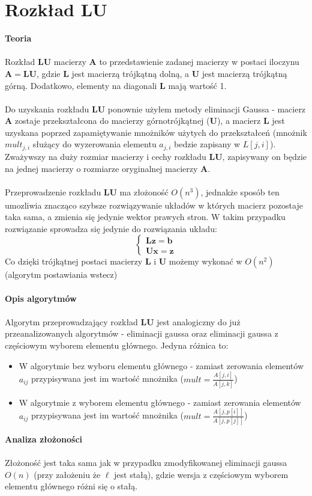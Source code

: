 \documentclass{article}
\newcommand{\mA}{\bm{A}}
\newcommand{\mL}{\bm{L}}
\newcommand{\mU}{\bm{U}}
\newcommand{\vb}{\bm{b}}
\newcommand{\vx}{\bm{x}}
\begin{document}
\section*{Rozkład LU}
\noindent \textbf{Teoria}\\\\
\indent Rozkład $\mL\mU$ macierzy $\mA$ to przedstawienie zadanej macierzy w postaci iloczynu $\mA=\mL\mU$, gdzie $\mL$ jest macierzą trójkątną dolną, a $\mU$ jest macierzą trójkątną górną. Dodatkowo, elementy na diagonali $\mL$ mają wartość 1. \\\\
\indent Do uzyskania rozkładu $\mL\mU$ ponownie użyłem metody eliminacji Gaussa - macierz $\mA$ zostaje przekształcona do macierzy górnotrójkątnej ($\mU$), a macierz $\mL$ jest uzyskana poprzed zapamiętywanie mnożników użytych do przekształceń (mnożnik $mult_{j,i}$ służący do wyzerowania elementu $a_{j,i}$ bedzie zapisany w $L[j,i]$). Zważywszy na duży rozmiar macierzy i cechy rozkładu $\mL\mU$, zapisywany on będzie na jednej macierzy o rozmiarze oryginalnej macierzy $\mA$.\\\\
\indent Przeprowadzenie rozkładu $\mL\mU$ ma złożoność $O(n^3)$, jednakże sposób ten umozliwia znacząco szybsze rozwiązywanie układów w których macierz pozostaje taka sama, a zmienia się jedynie wektor prawych stron. W takim przypadku rozwiązanie sprowadza się jedynie do rozwiązania układu:
$$
\left\{ \begin{array}{l}
\mL\bm{z} = \vb\\
\mU\vx = \bm{z}
\end{array} \right.
$$
Co dzięki trójkątnej postaci macierzy $\mL$ i $\mU$ możemy wykonać w $O(n^2)$ (algorytm postawiania wstecz) \\\\
\noindent \textbf{Opis algorytmów}\\\\
Algorytm przeprowadzający rozkład $\mL\mU$ jest analogiczny do już przeanalizowanych algorytmów - eliminacji gaussa oraz eliminacji gaussa z częściowym wyborem elementu głównego. Jedyna różnica to:
\begin{itemize}
	\item W algorytmie bez wyboru elementu głównego - zamiast zerowania elementów $a_{ij}$ przypisywana jest im wartość mnożnika ($mult = \frac{A[j,i]}{A[j,k]}$)
	\item W algorytmie z wyborem elementu głównego - zamiast zerowania elementów $a_{ij}$ przypisywana jest im wartość mnożnika ($mult = \frac{A[j,p[i]]}{A[j,p[j]]}$)
\end{itemize} 
\noindent \textbf{Analiza złożoności}\\\\
Złożoność jest taka sama jak w przypadku zmodyfikowanej eliminacji gaussa $O(n)$ (przy założeniu że $\ell$ jest stałą), gdzie wersja z częściowym wyborem elementu głównego różni się o stałą.
\newpage 
\end{document}
